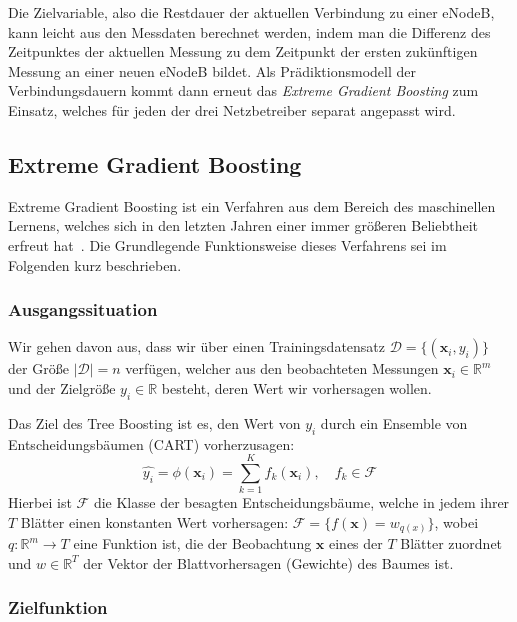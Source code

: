 Die Zielvariable, also die Restdauer der aktuellen Verbindung zu einer eNodeB, kann leicht aus den Messdaten berechnet werden,
indem man die Differenz des Zeitpunktes der aktuellen Messung zu dem Zeitpunkt der ersten zuk\"unftigen Messung an einer neuen
eNodeB bildet. Als Pr\"adiktionsmodell der Verbindungsdauern kommt dann erneut das \textit{Extreme Gradient Boosting} zum Einsatz,
welches f\"ur jeden der drei Netzbetreiber separat angepasst wird.

\subsection{Extreme Gradient Boosting}
\label{sec:xgboost}

Extreme Gradient Boosting ist ein Verfahren aus dem Bereich des maschinellen Lernens, welches sich
in den letzten Jahren einer immer gr\"o{\ss}eren Beliebtheit erfreut hat~\cite{XGBoost}.
Die Grundlegende Funktionsweise dieses Verfahrens sei im Folgenden kurz beschrieben.

\subsubsection{Ausgangssituation}

Wir gehen davon aus, dass wir \"uber einen Trainingsdatensatz $\mathcal{D} = \{(\mathbf{x}_i, y_i)\}$
der Gr\"o{\ss}e $\left| \mathcal{D} \right| = n$ verf\"ugen, welcher aus den beobachteten Messungen $\mathbf{x}_i \in \mathbb{R}^m$
und der Zielgr\"o{\ss}e $y_i \in \mathbb{R}$ besteht, deren Wert wir vorhersagen wollen.

Das Ziel des Tree Boosting ist es, den Wert von $y_i$ durch ein Ensemble von Entscheidungsb\"aumen (CART)
vorherzusagen:
\begin{equation}
    \hat{y_i} = \phi(\mathbf{x}_i) =  \sum_{k=1}^K f_k(\mathbf{x}_i), \quad f_k \in \mathcal{F}
\end{equation}
Hierbei ist $\mathcal{F}$ die Klasse der besagten Entscheidungsb\"aume, welche in jedem ihrer $T$ Bl\"atter
einen konstanten Wert vorhersagen: $\mathcal{F} = \{f(\mathbf{x}) = w_{q(x)}\}$, wobei $q: \mathbb{R}^m \rightarrow T$
eine Funktion ist, die der Beobachtung $\mathbf{x}$ eines der $T$ Bl\"atter zuordnet und $w \in \mathbb{R}^T$ der Vektor
der Blattvorhersagen (Gewichte) des Baumes ist.

\subsubsection{Zielfunktion}

